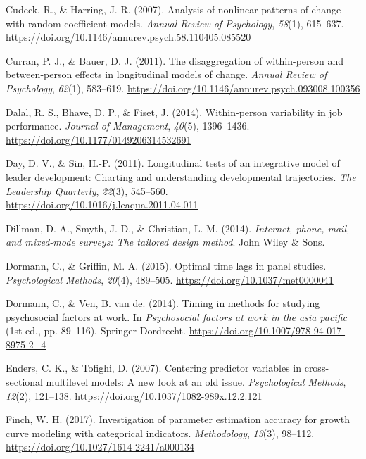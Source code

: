 \documentclass[
  english,
  man,floatsintext]{apa7}
\newlength{\cslhangindent}
\newlength{\cslentryspacingunit} %
\newenvironment{CSLReferences}[2] %
 {%
  \setlength{\parindent}{0pt}
  \ifodd #1
  \let\oldpar\par
  \def\par{\hangindent=\cslhangindent\oldpar}
  \fi
  \setlength{\parskip}{#2\cslentryspacingunit}
 }%
 {}
\begin{document}
\begin{CSLReferences}{1}{0}
\leavevmode{}%
Cudeck, R., \& Harring, J. R. (2007). Analysis of nonlinear patterns of change with random coefficient models. \emph{Annual Review of Psychology}, \emph{58}(1), 615--637. \url{https://doi.org/10.1146/annurev.psych.58.110405.085520}

\leavevmode{}%
Curran, P. J., \& Bauer, D. J. (2011). The disaggregation of within-person and between-person effects in longitudinal models of change. \emph{Annual Review of Psychology}, \emph{62}(1), 583--619. \url{https://doi.org/10.1146/annurev.psych.093008.100356}

\leavevmode{}%
Dalal, R. S., Bhave, D. P., \& Fiset, J. (2014). Within-person variability in job performance. \emph{Journal of Management}, \emph{40}(5), 1396--1436. \url{https://doi.org/10.1177/0149206314532691}

\leavevmode{}%
Day, D. V., \& Sin, H.-P. (2011). Longitudinal tests of an integrative model of leader development: Charting and understanding developmental trajectories. \emph{The Leadership Quarterly}, \emph{22}(3), 545--560. \url{https://doi.org/10.1016/j.leaqua.2011.04.011}

\leavevmode{}%
Dillman, D. A., Smyth, J. D., \& Christian, L. M. (2014). \emph{Internet, phone, mail, and mixed-mode surveys: The tailored design method}. John Wiley \& Sons.

\leavevmode{}%
Dormann, C., \& Griffin, M. A. (2015). Optimal time lags in panel studies. \emph{Psychological Methods}, \emph{20}(4), 489--505. \url{https://doi.org/10.1037/met0000041}

\leavevmode{}%
Dormann, C., \& Ven, B. van de. (2014). Timing in methods for studying psychosocial factors at work. In \emph{Psychosocial factors at work in the asia pacific} (1st ed., pp. 89--116). Springer Dordrecht. \url{https://doi.org/10.1007/978-94-017-8975-2_4}

\leavevmode{}%
Enders, C. K., \& Tofighi, D. (2007). Centering predictor variables in cross-sectional multilevel models: A new look at an old issue. \emph{Psychological Methods}, \emph{12}(2), 121--138. \url{https://doi.org/10.1037/1082-989x.12.2.121}

\leavevmode{}%
Finch, W. H. (2017). Investigation of parameter estimation accuracy for growth curve modeling with categorical indicators. \emph{Methodology}, \emph{13}(3), 98--112. \url{https://doi.org/10.1027/1614-2241/a000134}


\end{CSLReferences}
\end{document}
